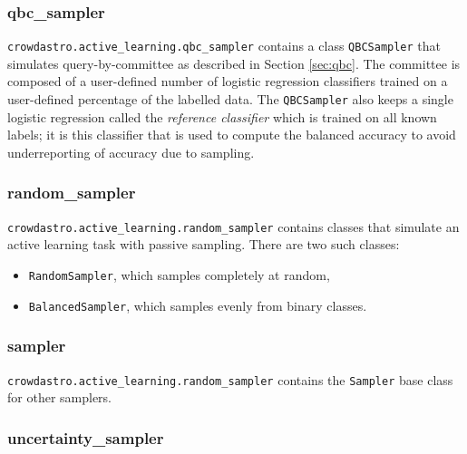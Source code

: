         \subsubsection{qbc\_sampler}
        \label{sec:crowdastro-qbc-sampler}

            \texttt{crowdastro.active\_learning.qbc\_sampler} contains a class
            \texttt{QBCSampler} that simulates query-by-committee as described
            in Section \ref{sec:qbc}. The committee is composed of a
            user-defined number of logistic regression classifiers trained on a
            user-defined percentage of the labelled data. The
            \texttt{QBCSampler} also keeps a single logistic regression called
            the \emph{reference classifier} which is trained on all known
            labels; it is this classifier that is used to compute the balanced
            accuracy to avoid underreporting of accuracy due to sampling.

        \subsubsection{random\_sampler}
        \label{sec:crowdastro-random-sampler}

            \texttt{crowdastro.active\_learning.random\_sampler} contains
            classes that simulate an active learning task with passive sampling.
            There are two such classes:
            \begin{itemize}
                \item \texttt{RandomSampler}, which samples completely at
                    random,
                \item \texttt{BalancedSampler}, which samples evenly from binary
                    classes.
            \end{itemize}

        \subsubsection{sampler}
        \label{sec:crowdastro-sampler}

            \texttt{crowdastro.active\_learning.random\_sampler} contains the
            \texttt{Sampler} base class for other samplers.

        \subsubsection{uncertainty\_sampler}
        \label{sec:crowdastro-uncertainty-sampler}

